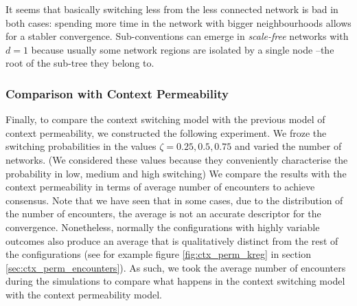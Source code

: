 \documentclass[preprint,number]{elsarticle}
\begin{document}
It seems that basically switching less from the less connected network is bad in both cases: spending more time in the network with bigger neighbourhoods allows for a stabler convergence. Sub-conventions can emerge in \textit{scale-free} networks with $d=1$ because usually some network regions are isolated by a single node --the root of the sub-tree they belong to. 



\subsubsection{Comparison with Context Permeability}
Finally, to compare the context switching model with the previous model of context permeability, we constructed the following experiment. We froze the switching probabilities in the values $\zeta={0.25,0.5,0.75}$ and varied the number of networks. (We considered these values because they conveniently characterise the probability in low, medium and high switching) We compare the results with the context permeability in terms of average number of encounters to achieve consensus. Note that we have seen that in some cases, due to the distribution of the number of encounters, the average is not an accurate descriptor for the convergence. Nonetheless, normally the configurations with highly variable outcomes also produce an average that is qualitatively distinct from the rest of the configurations (see for example figure \ref{fig:ctx_perm_kreg} in section \ref{sec:ctx_perm_encounters}). As such, we took the average number of encounters during the simulations to compare what happens in the context switching model with the context permeability model.
\end{document}
